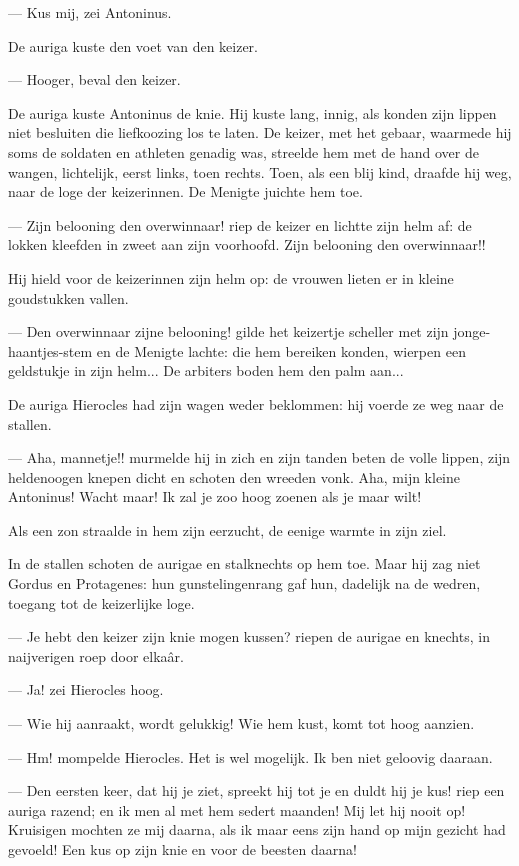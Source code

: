 \documentclass[a4paper, 12pt, oneside, dutch]{article}
\begin{document}
--- Kus mij, zei Antoninus.

De auriga kuste den voet van den keizer.

--- Hooger, beval den keizer.

De auriga kuste Antoninus de knie. Hij kuste lang, innig, als konden zijn lippen niet besluiten die liefkoozing los te laten. De keizer, met het gebaar, waarmede hij soms de soldaten en athleten genadig was, streelde hem met de hand over de wangen, lichtelijk, eerst links, toen rechts. Toen, als een blij kind, draafde hij weg, naar de loge der keizerinnen. De Menigte juichte hem toe.

--- Zijn belooning den overwinnaar! riep de keizer en lichtte zijn helm af: de lokken kleefden in zweet aan zijn voorhoofd. Zijn belooning den overwinnaar!!

Hij hield voor de keizerinnen zijn helm op: de vrouwen lieten er in kleine goudstukken vallen.

--- Den overwinnaar zijne belooning! gilde het keizertje scheller met zijn jonge-haantjes-stem en de Menigte lachte: die hem bereiken konden, wierpen een geldstukje in zijn helm... De arbiters boden hem den palm aan...

De auriga Hierocles had zijn wagen weder beklommen: hij voerde ze weg naar de stallen.

--- Aha, mannetje!! murmelde hij in zich en zijn tanden beten de volle lippen, zijn heldenoogen knepen dicht en schoten den wreeden vonk. Aha, mijn kleine Antoninus! Wacht maar! Ik zal je zoo hoog zoenen als je maar wilt!

Als een zon straalde in hem zijn eerzucht, de eenige warmte in zijn ziel.

In de stallen schoten de aurigae en stalknechts op hem toe. Maar hij zag niet Gordus en Protagenes: hun gunstelingenrang gaf hun, dadelijk na de wedren, toegang tot de keizerlijke loge.

--- Je hebt den keizer zijn knie mogen kussen? riepen de aurigae en knechts, in naijverigen roep door elkaâr.

--- Ja! zei Hierocles hoog.

--- Wie hij aanraakt, wordt gelukkig! Wie hem kust, komt tot hoog aanzien.

--- Hm! mompelde Hierocles. Het is wel mogelijk. Ik ben niet geloovig daaraan.

--- Den eersten keer, dat hij je ziet, spreekt hij tot je en duldt hij je kus! riep een auriga razend; en ik men al met hem sedert maanden! Mij let hij nooit op! Kruisigen mochten ze mij daarna, als ik maar eens zijn hand op mijn gezicht had gevoeld! Een kus op zijn knie en voor de beesten daarna!
\end{document}
